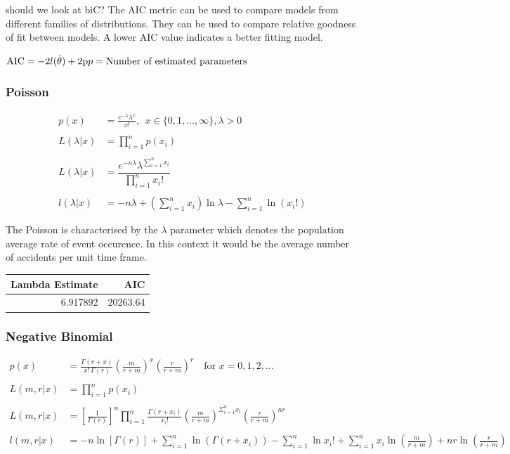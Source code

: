 \documentclass[11pt,preprint, authoryear]{elsarticle}
\numberwithin{equation}{section}
\numberwithin{figure}{section}
\numberwithin{table}{section}
\begin{document}
should we look at biC? The AIC metric can be used to compare models from
different families of distributions. They can be used to compare
relative goodness of fit between models. A lower AIC value indicates a
better fitting model.

\(\text{AIC} = -2l(\hat{\theta}) + 2\text{p} \\ p = \text{Number of estimated parameters}\)

\subsubsection{Poisson}\label{poisson}

\begin{align*} 
p(x) & =  \frac{e^{-\lambda} \lambda^x}{x!},\ \ x\in \{0,1,\ldots,\infty\},\lambda>0 \\
\\
L(\lambda|x) & = \prod_{i=1}^n p(x_i) \\
\\
L(\lambda|x) & =\dfrac{e^{-n\lambda}\lambda^{\sum_{i=1}^n x_i}}{\prod_{i=1}^n x_i!}\\
\\
l(\lambda|x) & =-n\lambda +  \left(\sum_{i=1}^n x_i\right)\ln \lambda - \sum_{i=1}^{n}\ln(x_i!)
\end{align*}

The Poisson is characterised by the \(\lambda\) parameter which denotes
the population average rate of event occurence. In this context it would
be the average number of accidents per unit time frame.

\begin{longtable}[]{@{}rr@{}}
\toprule
Lambda Estimate & AIC\tabularnewline
\midrule
\endhead
6.917892 & 20263.64\tabularnewline
\bottomrule
\end{longtable}

\subsubsection{Negative Binomial}\label{negative-binomial}

\begin{align*} 
p(x) & =  {\frac {\Gamma (r+x)}{x!\,\Gamma (r)}}\left({\frac {m}{r+m}}\right)^{x}\left({\frac {r}{r+m}}\right)^{r}\quad {\text{for }}x=0,1,2,\dotsc \\
\\
L(m,r|x) & = \prod_{i=1}^n p(x_i) \\
\\
L(m,r|x) & ={[\frac{1}{\Gamma (r)}]}^{n} \prod_{i=1}^{n}{\frac{\Gamma (r+x_i)}{x_{i}!}} (\frac{m}{r + m})^{\Sigma_{i=1}^n x_i} (\frac{r}{r + m})^{nr}   \\
\\
l(m,r|x) & = -n\ln[\Gamma (r)] + \sum^{n}_{i=1} \ln(\Gamma (r + x_i)) -\sum^{n}_{i=1}\ln x_i! + \sum^{n}_{i=1} x_{i} \ln (\frac{m}{r + m}) + nr \ln (\frac{r}{r + m})
\end{align*}
\end{document}
